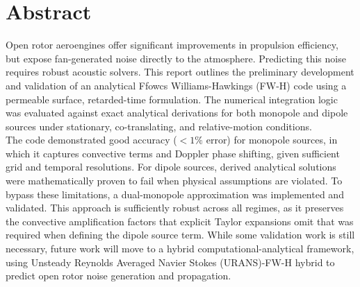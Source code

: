 \documentclass[12pt, a4paper]{report}
\numberwithin{equation}{chapter}
\numberwithin{figure}{chapter}
\begin{document}


\clearpage
\chapter*{Abstract}
\thispagestyle{plain}
\normalsize
\onehalfspacing
\noindent Open rotor aeroengines offer significant improvements in propulsion efficiency, but expose fan-generated noise directly to the atmosphere. Predicting this noise requires robust acoustic solvers. This report outlines the preliminary development and validation of an analytical Ffowcs Williams-Hawkings (FW-H) code using a permeable surface, retarded-time formulation. The numerical integration logic was evaluated against exact analytical derivations for both monopole and dipole sources under stationary, co-translating, and relative-motion conditions.\\

\noindent The code demonstrated good accuracy ($<1\%$ error) for monopole sources, in which it captures convective terms and Doppler phase shifting, given sufficient grid and temporal resolutions. For dipole sources, derived analytical solutions were mathematically proven to fail when physical assumptions are violated. To bypass these limitations, a dual-monopole approximation was implemented and validated. This approach is sufficiently robust across all regimes, as it preserves the convective amplification factors that explicit Taylor expansions omit that was required when defining the dipole source term. While some validation work is still necessary, future work will move to a hybrid computational-analytical framework, using Unsteady Reynolds Averaged Navier Stokes (URANS)-FW-H hybrid to predict open rotor noise generation and propagation.
\end{document}

